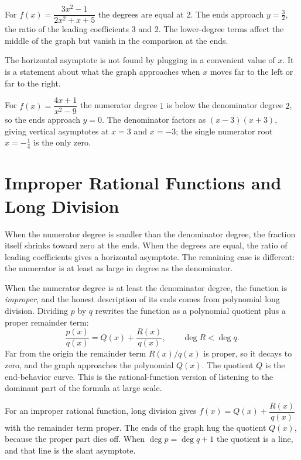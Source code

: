 \documentclass[12pt]{book}
\begin{document}
\begin{example}
For $f(x)=\dfrac{3x^2-1}{2x^2+x+5}$ the degrees are equal at $2$. The ends approach
$y=\tfrac{3}{2}$, the ratio of the leading coefficients $3$ and $2$. The lower-degree
terms affect the middle of the graph but vanish in the comparison at the ends.
\end{example}

The horizontal asymptote is not found by plugging in a convenient value of $x$. It is
a statement about what the graph approaches when $x$ moves far to the left or far to
the right.

\begin{example}
For $f(x)=\dfrac{4x+1}{x^2-9}$ the numerator degree $1$ is below the denominator
degree $2$, so the ends approach $y=0$. The denominator factors as $(x-3)(x+3)$,
giving vertical asymptotes at $x=3$ and $x=-3$; the single numerator root
$x=-\tfrac14$ is the only zero.
\end{example}

\section{Improper Rational Functions and Long Division}

When the numerator degree is smaller than the denominator degree, the fraction itself
shrinks toward zero at the ends. When the degrees are equal, the ratio of leading
coefficients gives a horizontal asymptote. The remaining case is different: the
numerator is at least as large in degree as the denominator.

When the numerator degree is at least the denominator degree, the function is
\emph{improper}, and the honest description of its ends comes from polynomial long
division. Dividing $p$ by $q$ rewrites the function as a polynomial quotient plus a
proper remainder term:
\[
\frac{p(x)}{q(x)}=Q(x)+\frac{R(x)}{q(x)},\qquad \deg R<\deg q.
\]
Far from the origin the remainder term $R(x)/q(x)$ is proper, so it decays to zero,
and the graph approaches the polynomial $Q(x)$. The quotient $Q$ is the end-behavior
curve. This is the rational-function version of listening to the dominant part of
the formula at large scale.

\begin{keyidea}
For an improper rational function, long division gives
$f(x)=Q(x)+\dfrac{R(x)}{q(x)}$ with the remainder term proper. The ends of the graph
hug the quotient $Q(x)$, because the proper part dies off. When $\deg p=\deg q+1$ the
quotient is a line, and that line is the slant asymptote.
\end{keyidea}
\end{document}
